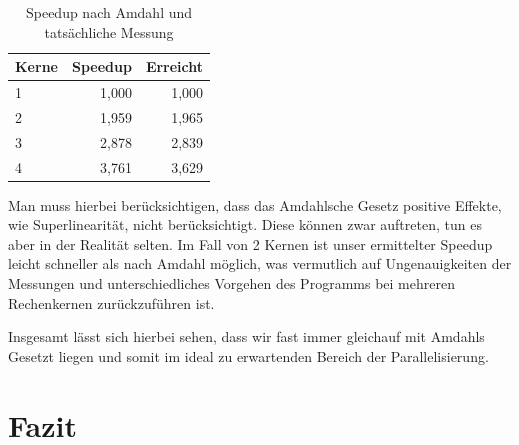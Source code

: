 \documentclass[a4paper]{scrartcl}
\begin{document}
\begin{table}
\caption{Speedup nach Amdahl und tatsächliche Messung}
\centering
 \begin{tabular}[h!]{l||r|r}
  Kerne & Speedup & Erreicht \\
  \hline
  \hline
   1 & 1,000& 1,000 \\
   2 & 1,959 & 1,965 \\
   3 & 2,878 & 2,839 \\
   4 & 3,761 & 3,629
 \end{tabular}
 \label{tab:Amdahl}
\end{table}

Man muss hierbei berücksichtigen, dass das Amdahlsche Gesetz positive Effekte, wie Superlinearität, nicht berücksichtigt. Diese können zwar auftreten, tun es aber in der Realität selten. Im Fall von 2 Kernen ist unser ermittelter Speedup leicht schneller als nach Amdahl möglich, was vermutlich auf Ungenauigkeiten der Messungen und unterschiedliches Vorgehen des Programms bei mehreren Rechenkernen zurückzuführen ist.\par
\medskip
Insgesamt lässt sich hierbei sehen, dass wir fast immer gleichauf mit Amdahls Gesetzt liegen und somit im ideal zu erwartenden Bereich der Parallelisierung.


\section{Fazit}
\end{document}
